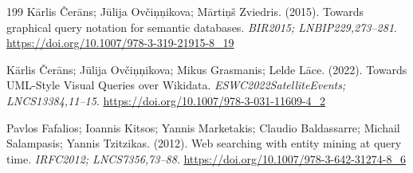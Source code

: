 \documentclass[manuscript,review,screen]{acmart}
\begin{document}
\begin{thebibliography}{199}
 K\={a}rlis \v{C}er\={a}ns; J\={u}lija Ov\v{c}i\c{n}\c{n}ikova; M\={a}rti\c{n}\v{s} Zviedris. (2015). Towards graphical query notation for semantic databases. \textit{BIR2015; LNBIP229,273--281}. \url{https://doi.org/10.1007/978-3-319-21915-8_19}

 K\={a}rlis \v{C}er\={a}ns; J\={u}lija Ov\v{c}i\c{n}\c{n}ikova; Mikus Grasmanis; Lelde L\={a}ce. (2022). Towards UML-Style Visual Queries over Wikidata. \textit{ESWC2022SatelliteEvents; LNCS13384,11--15}. \url{https://doi.org/10.1007/978-3-031-11609-4_2}

 Pavlos Fafalios; Ioannis Kitsos; Yannis Marketakis; Claudio Baldassarre; Michail Salampasis; Yannis Tzitzikas. (2012). Web searching with entity mining at query time. \textit{IRFC2012; LNCS7356,73--88}. \url{https://doi.org/10.1007/978-3-642-31274-8_6}
\end{thebibliography}
\end{document}
